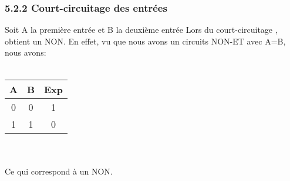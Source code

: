 \documentclass{report}
\begin{document}
\subsubsection*{5.2.2 Court-circuitage des entr\'ees}
\hspace*{1,5cm} Soit A la premi\`ere entr\'ee et B la deuxième entr\'ee Lors du court-circuitage , obtient un NON. En effet, vu que nous avons un circuits NON-ET avec A=B, nous avons:\\
\\
\begin{tabular}{|c|c|c|}
\hline
A& B & Exp \\
\hline
0&0&1\\
1&1&0\\
\hline
\end{tabular}\\
\\
\hspace*{1,5cm} Ce qui correspond \`a un NON.
\end{document}
